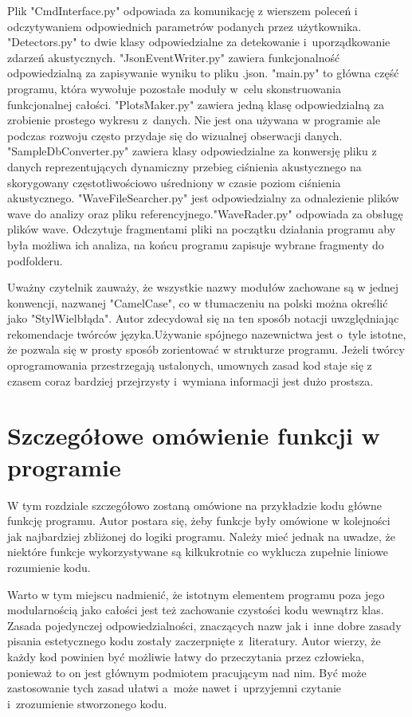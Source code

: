 \documentclass[eng,printmode]{mgr}
\begin{document}
Plik "CmdInterface.py" odpowiada za komunikację z wierszem poleceń i odczytywaniem odpowiednich parametrów podanych przez użytkownika. "Detectors.py" to dwie klasy odpowiedzialne za detekowanie i~uporządkowanie zdarzeń akustycznych. "JsonEventWriter.py" zawiera funkcjonalność odpowiedzialną za zapisywanie wyniku to pliku .json. "main.py" to główna część programu, która wywołuje pozostałe moduły w~celu skonstruowania funkcjonalnej całości. "PlotsMaker.py" zawiera jedną klasę odpowiedzialną za zrobienie prostego wykresu z~danych. Nie jest ona używana w programie ale podczas rozwoju często przydaje się do wizualnej obserwacji danych. "SampleDbConverter.py" zawiera klasy odpowiedzialne za konwersję pliku z danych reprezentujących dynamiczny przebieg ciśnienia akustycznego na skorygowany częstotliwościowo uśredniony w czasie poziom ciśnienia akustycznego. "WaveFileSearcher.py" jest odpowiedzialny za odnalezienie plików wave do analizy oraz pliku referencyjnego."WaveRader.py" odpowiada za obsługę plików wave. Odczytuje fragmentami pliki na początku działania programu aby była możliwa ich analiza, na końcu programu zapisuje wybrane fragmenty do podfolderu. 

Uważny czytelnik zauważy, że wszystkie nazwy modułów zachowane są w jednej konwencji, nazwanej "CamelCase", co w tłumaczeniu na polski można określić jako "StylWielbłąda". Autor zdecydował się na ten sposób notacji uwzględniając rekomendacje twórców języka.\cite{PEP8}Używanie spójnego nazewnictwa jest o~tyle istotne, że pozwala się w prosty sposób zorientować w strukturze programu. Jeżeli twórcy oprogramowania przestrzegają ustalonych, umownych zasad kod staje się z czasem coraz bardziej przejrzysty i~wymiana informacji jest dużo prostsza. 

\chapter{Szczegółowe omówienie funkcji w programie}
W tym rozdziale szczegółowo zostaną omówione na przykładzie kodu główne funkcję programu. Autor postara się, żeby funkcje były omówione w kolejności jak najbardziej zbliżonej do logiki programu. Należy mieć jednak na uwadze, że niektóre funkcje wykorzystywane są kilkukrotnie co wyklucza zupełnie liniowe rozumienie kodu.

Warto w tym miejscu nadmienić, że istotnym elementem programu poza jego modularnością jako całości jest też zachowanie czystości kodu wewnątrz klas. Zasada pojedynczej odpowiedzialności, znaczących nazw jak i~inne dobre zasady pisania estetycznego kodu zostały zaczerpnięte z~literatury\cite{Czysty_kod}. Autor wierzy, że każdy kod powinien być możliwie łatwy do przeczytania przez człowieka, ponieważ to on jest głównym podmiotem pracującym nad nim. Być może zastosowanie tych zasad ułatwi a~może nawet i~uprzyjemni czytanie i~zrozumienie stworzonego kodu. 
\end{document}
